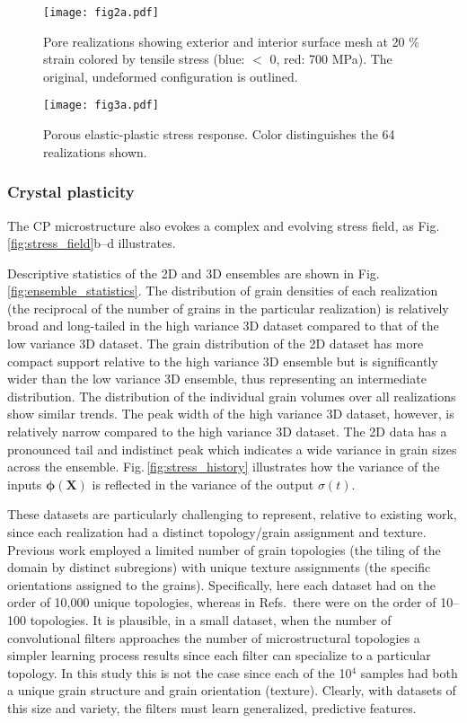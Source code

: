 \documentclass[12pt,reqno]{article}
\newcommand{\ADD}[1]{{#1}}
\newcommand{\fref}[1]{Fig.\,\ref{#1}}
\newcommand{\crefs}[1]{Refs.\,\cite{#1}}
\newcommand{\Xb}{\mathbf{X}}
\newcommand{\phib}{{\boldsymbol{\phi}}}
\begin{document}
\begin{figure}
\centering
{\texttt{[image: fig2a.pdf]}}
\caption{\ADD{Pore realizations showing exterior and interior surface mesh at 20 \% strain colored by tensile stress (blue: $<$ 0, red: 700 MPa).
The original, undeformed configuration is outlined.}
}
\label{fig:pore_stress}
\end{figure}

\begin{figure}
\centering
{\texttt{[image: fig3a.pdf]}}
\caption{\ADD{Porous elastic-plastic stress response.
Color distinguishes the 64 realizations shown.
}
}
\label{fig:porous_stress_history}
\end{figure}


\subsubsection{Crystal plasticity} \label{sec:cp_response}
The CP microstructure also evokes a complex and evolving stress field, as \fref{fig:stress_field}b--d illustrates.

Descriptive statistics of the 2D and 3D ensembles are shown in \fref{fig:ensemble_statistics}.
The distribution of grain densities of each realization (the reciprocal of the number of grains in the particular realization) is relatively broad and long-tailed in the high variance 3D dataset compared to that of the low variance 3D dataset.
The grain distribution of the 2D dataset has more compact support relative to the high variance 3D ensemble but is significantly wider than the low variance 3D ensemble, thus representing an intermediate distribution.
The distribution of the individual grain volumes over all realizations show similar trends.
The peak width of the high variance 3D dataset, however, is relatively narrow compared to the high variance 3D dataset.
The 2D data has a pronounced tail and indistinct peak which indicates a wide variance in grain sizes across the ensemble.
\fref{fig:stress_history} illustrates how the variance of the inputs $\phib(\Xb)$ is reflected in the variance of the output $\sigma(t)$.

These datasets are particularly challenging to represent, relative to existing work, since each realization had a distinct topology/grain assignment and texture.
Previous work \cite{frankel2019oligocrystals,vlassis2020geometric} employed a limited number of grain topologies \ADD{(the tiling of the domain by distinct subregions)} with unique texture assignments \ADD{(the specific orientations assigned to the grains)}.
Specifically, here each dataset had on the order of 10,000 unique topologies, whereas  in \crefs{frankel2019oligocrystals,vlassis2020geometric} there were on the order of 10--100 topologies.
\ADD{
It is plausible, in a small dataset, when the number of convolutional filters approaches the number of microstructural topologies a simpler learning process results since each filter can specialize to a particular topology.
In this study this is not the case since each of the 10$^4$ samples had both a unique grain structure and grain orientation (texture).
Clearly, with datasets of this size and variety, the filters must learn generalized, predictive features.
}
\end{document}
